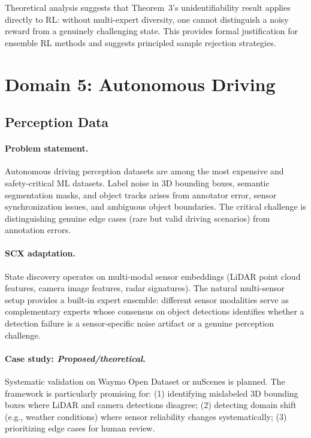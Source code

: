 \documentclass[twocolumn]{article}
\theoremstyle{definition}
\begin{document}
Theoretical analysis \cite{theorems_unified} suggests that Theorem~3's unidentifiability result applies directly to RL: without multi-expert diversity, one cannot distinguish a noisy reward from a genuinely challenging state. This provides formal justification for ensemble RL methods and suggests principled sample rejection strategies.

\section{Domain 5: Autonomous Driving}

\subsection{Perception Data}

\paragraph{Problem statement.}
Autonomous driving perception datasets are among the most expensive and safety-critical ML datasets. Label noise in 3D bounding boxes, semantic segmentation masks, and object tracks arises from annotator error, sensor synchronization issues, and ambiguous object boundaries. The critical challenge is distinguishing genuine edge cases (rare but valid driving scenarios) from annotation errors.

\paragraph{SCX adaptation.}
State discovery operates on multi-modal sensor embeddings (LiDAR point cloud features, camera image features, radar signatures). The natural multi-sensor setup provides a built-in expert ensemble: different sensor modalities serve as complementary experts whose consensus on object detections identifies whether a detection failure is a sensor-specific noise artifact or a genuine perception challenge.

\paragraph{Case study: \emph{Proposed/theoretical}.}
Systematic validation on Waymo Open Dataset or nuScenes is planned. The framework is particularly promising for: (1) identifying mislabeled 3D bounding boxes where LiDAR and camera detections disagree; (2) detecting domain shift (e.g., weather conditions) where sensor reliability changes systematically; (3) prioritizing edge cases for human review.
\end{document}
